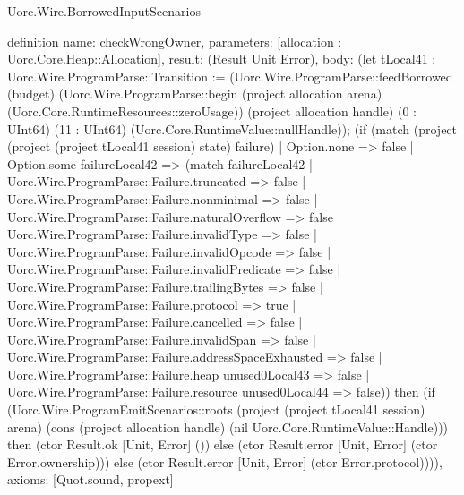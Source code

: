 \begin{lexlean}{Uorc.Wire.BorrowedInputScenarios}
\begin{semanticmodule}
definition{
  name: checkWrongOwner,
  parameters: [allocation : Uorc.Core.Heap::Allocation],
  result: (Result Unit Error),
  body: (let tLocal41 : Uorc.Wire.ProgramParse::Transition := (Uorc.Wire.ProgramParse::feedBorrowed (budget) (Uorc.Wire.ProgramParse::begin (project allocation arena) (Uorc.Core.RuntimeResources::zeroUsage)) (project allocation handle) (0 : UInt64) (11 : UInt64) (Uorc.Core.RuntimeValue::nullHandle)); (if (match (project (project (project tLocal41 session) state) failure)
    | Option.none => false
    | Option.some failureLocal42 => (match failureLocal42
      | Uorc.Wire.ProgramParse::Failure.truncated => false
      | Uorc.Wire.ProgramParse::Failure.nonminimal => false
      | Uorc.Wire.ProgramParse::Failure.naturalOverflow => false
      | Uorc.Wire.ProgramParse::Failure.invalidType => false
      | Uorc.Wire.ProgramParse::Failure.invalidOpcode => false
      | Uorc.Wire.ProgramParse::Failure.invalidPredicate => false
      | Uorc.Wire.ProgramParse::Failure.trailingBytes => false
      | Uorc.Wire.ProgramParse::Failure.protocol => true
      | Uorc.Wire.ProgramParse::Failure.cancelled => false
      | Uorc.Wire.ProgramParse::Failure.invalidSpan => false
      | Uorc.Wire.ProgramParse::Failure.addressSpaceExhausted => false
      | Uorc.Wire.ProgramParse::Failure.heap unused0Local43 => false
      | Uorc.Wire.ProgramParse::Failure.resource unused0Local44 => false)) then (if (Uorc.Wire.ProgramEmitScenarios::roots (project (project tLocal41 session) arena) (cons (project allocation handle) (nil Uorc.Core.RuntimeValue::Handle))) then (ctor Result.ok [Unit, Error] ()) else (ctor Result.error [Unit, Error] (ctor Error.ownership))) else (ctor Result.error [Unit, Error] (ctor Error.protocol)))),
  axioms: [Quot.sound, propext]
}


\end{semanticmodule}
\end{lexlean}
